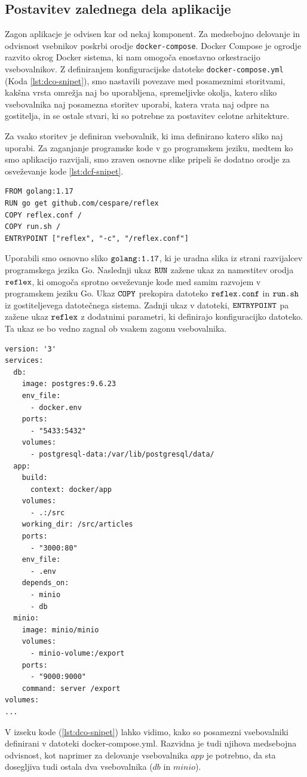 \documentclass[a4paper, 12pt]{book}
\begin{document}
\subsection{Postavitev zalednega dela aplikacije}
Zagon aplikacje je odvisen kar od nekaj komponent. Za medsebojno delovanje in odvisnost vsebnikov poskrbi orodje \verb=docker-compose=. Docker Compose je ogrodje razvito okrog Docker sistema, ki nam omogoča enostavno orkestracijo vsebovalnikov. Z definiranjem konfiguracijske datoteke \verb=docker-compose.yml= (Koda \ref{lst:dco-snipet}), smo nastavili povezave med posameznimi storitvami, kakšna vrsta omrežja naj bo uporabljena, spremeljivke okolja, katero sliko vsebovalnika naj posamezna storitev uporabi, katera vrata naj odpre na gostitelja, in se ostale stvari, ki so potrebne za postavitev celotne arhitekture.

Za vsako storitev je definiran vsebovalnik, ki ima definirano katero sliko naj uporabi. Za zaganjanje programske kode v go programskem jeziku, medtem ko smo aplikacijo razvijali, smo zraven osnovne slike pripeli še dodatno orodje za osveževanje kode \ref{lst:dcf-snipet}.

\begin{lstlisting}[style=mystyle,caption={Dockerfile datoteka za razvijanje Go programske opreme},label=lst:dcf-snipet]
FROM golang:1.17
RUN go get github.com/cespare/reflex
COPY reflex.conf /
COPY run.sh /
ENTRYPOINT ["reflex", "-c", "/reflex.conf"]
\end{lstlisting}

Uporabili smo osnovno sliko $\verb=golang:1.17=$, ki je uradna slika iz strani razvijalcev programskega jezika Go. Naslednji ukaz $\verb=RUN=$ zažene ukaz za namestitev orodja $\verb=reflex=$, ki omogoča sprotno osveževanje kode med samim razvojem v programskem jeziku Go. Ukaz $\verb=COPY=$ prekopira datoteko $\verb=reflex.conf=$ in $\verb=run.sh=$ iz gostiteljevega datotečnega sistema. Zadnji ukaz v datoteki, $\verb=ENTRYPOINT=$ pa zažene ukaz $\verb=reflex=$ z dodatnimi parametri, ki definirajo konfiguracijko datoteko. Ta ukaz se bo vedno zagnal ob vsakem zagonu vsebovalnika.

\begin{lstlisting}[style=mystyle,caption={Izsek konfiguracijske datoteke docker-compose.yml},label=lst:dco-snipet]
version: '3'
services:
  db:
    image: postgres:9.6.23
    env_file:
      - docker.env
    ports:
      - "5433:5432"
    volumes:
      - postgresql-data:/var/lib/postgresql/data/
  app:
    build:
      context: docker/app
    volumes:
      - .:/src
    working_dir: /src/articles
    ports:
      - "3000:80"
    env_file:
      - .env
    depends_on:
      - minio
      - db
  minio:
    image: minio/minio
    volumes:
      - minio-volume:/export
    ports:
      - "9000:9000"
    command: server /export
volumes:
...
\end{lstlisting}
V izseku kode (\ref{lst:dco-snipet}) lahko vidimo, kako so posamezni vsebovalniki definirani v datoteki docker-compose.yml. Razvidna je tudi njihova medsebojna odvisnost, kot naprimer za delovanje vsebovalnika $app$ je potrebno, da sta dosegljiva tudi ostala dva vsebovalnika ($db$ in $minio$).
\end{document}
